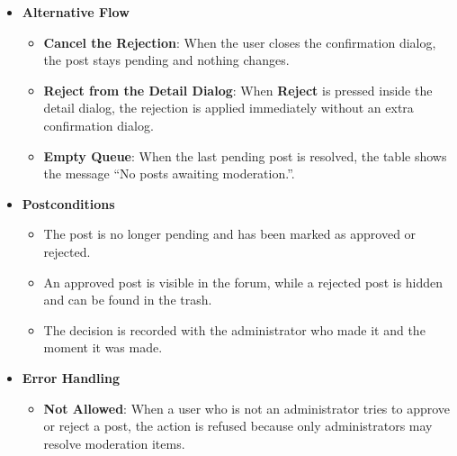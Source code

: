 \begin{itemize}[leftmargin=1.6em,topsep=4pt,itemsep=3pt,parsep=0pt,label=$\bullet$]
\begin{itemize}[leftmargin=2.2em,topsep=2pt,itemsep=3pt,parsep=0pt,label=$\circ$]
                \begin{itemize}[leftmargin=2.2em,topsep=2pt,itemsep=3pt,parsep=0pt,label=$\blacksquare$]
                    \item The post is never shown to ordinary users while it stays rejected.
                    \item The screen shows the message ``Post rejected and moved to trash''.
                \end{itemize}
            \item \textbf{Update the Queue}: The resolved post disappears from the list and the remaining items move up, so the queue always shows only the posts that still need a decision.
        \end{itemize}
    \item \textbf{Alternative Flow}
        \begin{itemize}[leftmargin=2.2em,topsep=2pt,itemsep=3pt,parsep=0pt,label=$\circ$]
            \item \textbf{Cancel the Rejection}: When the user closes the confirmation dialog, the post stays pending and nothing changes.
            \item \textbf{Reject from the Detail Dialog}: When \textbf{Reject} is pressed inside the detail dialog, the rejection is applied immediately without an extra confirmation dialog.
            \item \textbf{Empty Queue}: When the last pending post is resolved, the table shows the message ``No posts awaiting moderation.''.
        \end{itemize}
    \item \textbf{Postconditions}
        \begin{itemize}[leftmargin=2.2em,topsep=2pt,itemsep=3pt,parsep=0pt,label=$\circ$]
            \item The post is no longer pending and has been marked as approved or rejected.
            \item An approved post is visible in the forum, while a rejected post is hidden and can be found in the trash.
            \item The decision is recorded with the administrator who made it and the moment it was made.
        \end{itemize}
    \item \textbf{Error Handling}
        \begin{itemize}[leftmargin=2.2em,topsep=2pt,itemsep=3pt,parsep=0pt,label=$\circ$]
            \item \textbf{Not Allowed}: When a user who is not an administrator tries to approve or reject a post, the action is refused because only administrators may resolve moderation items.

\end{itemize}
\end{itemize}
